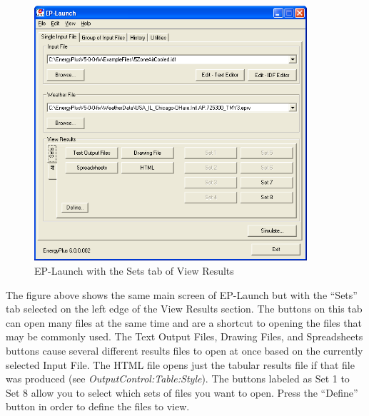 \begin{figure}[hbtp] %
\centering
\includegraphics[width=0.9\textwidth, height=0.9\textheight, keepaspectratio=true]{media/image103.png}
\caption{EP-Launch with the Sets tab of View Results \protect \label{fig:ep-launch-with-the-sets-tab-of-view-results}}
\end{figure}

The figure above shows the same main screen of EP-Launch but with the ``Sets'' tab selected on the left edge of the View Results section. The buttons on this tab can open many files at the same time and are a shortcut to opening the files that may be commonly used. The Text Output Files, Drawing Files, and Spreadsheets buttons cause several different results files to open at once based on the currently selected Input File. The HTML file opens just the tabular results file if that file was produced (see \emph{OutputControl:Table:Style}). The buttons labeled as Set 1 to Set 8 allow you to select which sets of files you want to open. Press the ``Define'' button in order to define the files to view.

